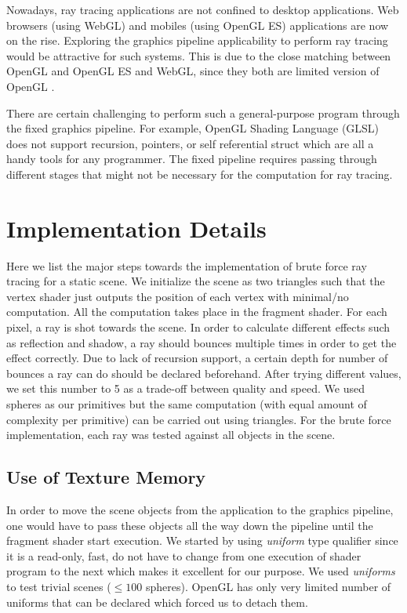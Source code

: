 \documentclass[a4paper,10pt]{article}
\begin{document}
Nowadays, ray tracing applications are not confined to desktop applications. Web browsers (using WebGL) and mobiles (using OpenGL ES) applications are now on the rise. Exploring the graphics pipeline applicability to perform ray tracing would be attractive for such systems. This is due to the close matching between OpenGL and OpenGL ES and WebGL, since they both are limited version of OpenGL \cite{hachisuka2015implementing}.

There are certain challenging to perform such a general-purpose program through the fixed graphics pipeline. For example, OpenGL Shading Language (GLSL) does not support recursion, pointers, or self referential struct which are all a handy tools for any programmer. The fixed pipeline requires passing through different stages that might not be necessary for the computation for ray tracing. 

\section{Implementation Details}
Here we list the major steps towards the implementation of brute force ray tracing for a static scene. We initialize the scene as two triangles such that the vertex shader just outputs the position of each vertex with minimal/no computation. All the computation takes place in the fragment shader. For each pixel, a ray is shot towards the scene. In order to calculate different effects such as reflection and shadow, a ray should bounces multiple times in order to get the effect correctly. Due to lack of recursion support, a certain depth for number of bounces a ray can do should be declared beforehand. After trying different values, we set this number to 5 as a trade-off between quality and speed. We used spheres as our primitives but the same computation (with equal amount of complexity per primitive) can be carried out using triangles. For the brute force implementation, each ray was tested against all objects in the scene. 

\subsection{Use of Texture Memory}
In order to move the scene objects from the application to the graphics pipeline, one would have to pass these objects all the way down the pipeline until the fragment shader start execution. We started by using \emph{uniform} type qualifier since it is a read-only, fast, do not have to change from one execution of shader program to the next which makes it excellent for our purpose. We used \emph{uniforms} to test trivial scenes ($\leq 100$ spheres). OpenGL has only very limited number of uniforms that can be declared which forced us to detach them. 
\end{document}

